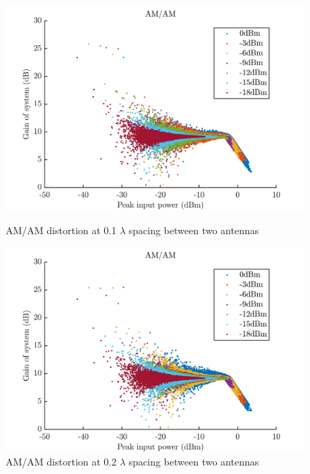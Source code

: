 \begin{figure}[H]
  \centering
  \begin{minipage}[b]{0.5\textwidth}
	\includegraphics[scale = 0.5]{figures/measurement/two_antenna/amam_01.png}
	\caption{AM/AM distortion at 0.1 $\lambda$ spacing between two antennas}
    \label{fig:amam01}
  \end{minipage}
  \hfill
  \begin{minipage}[b]{0.4\textwidth}
\includegraphics[scale = 0.5]{figures/measurement/two_antenna/amam_02.png}
\caption{AM/AM distortion at 0.2 $\lambda$ spacing between two antennas}
    \label{fig:amam02}
  \end{minipage}
\end{figure}

